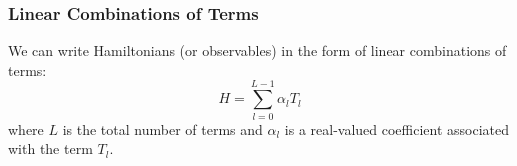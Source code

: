 
\subsubsection{Linear Combinations of Terms}

We can write Hamiltonians (or observables) in the form of linear combinations of terms:
\begin{equation}
    \label{eq:lclo}
    H = \sum_{l=0}^{L-1} \alpha_l T_l
\end{equation}
where $L$ is the total number of terms and $\alpha_l$ is a real-valued coefficient associated with the term $T_l$.